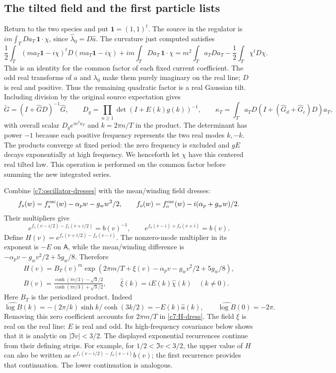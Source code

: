 \subsection{The tilted field and the first particle lists}

Return to the two species and put $\mathbf1=(1,1)^t$.  The source in the
regulator is $im\int_TDa_T\,\mathbf1\cdot\chi$, since
$\widehat\lambda_0=D\widehat a$.  The curvature just computed satisfies
\[
\frac12\int_T(ma_T\mathbf1-i\chi)^tD(ma_T\mathbf1-i\chi)
+im\int_TDa_T\,\mathbf1\cdot\chi
=m^2\int_Ta_TDa_T-\frac12\int_T\chi^tD\chi.
\]
This is an identity for the common factor of each fixed current coefficient.
The odd real transforms of $a$ and $\lambda_0$ make them purely imaginary
on the real line; $D$ is real and positive.  Thus the remaining quadratic
factor is a real Gaussian tilt.  Including division by the original source
expectation gives
\begin{equation}\label{c7:source-removal}
\widetilde G=(I+\widehat GD)^{-1}\widehat G,\qquad
D_g=\prod_{n\ge1}\det(I+E(k)g(k))^{-1},\qquad
\kappa_T=\int_T a_TD(I+(\widehat G_d+\widehat G_c)D)a_T,
\end{equation}
with overall scalar $D_g e^{m^2\kappa_T}$ and $k=2\pi n/T$ in the product.
The determinant has power $-1$ because each positive frequency represents
the two real modes $k,-k$.  The products converge at fixed period: the zero
frequency is excluded and $gE$ decays exponentially at high frequency.
We henceforth let $\chi$ have this centered real tilted law.  This operation
is performed on the common factor before summing the new integrated series.

Combine \eqref{c7:oscillator-dresses} with the mean/winding field dresses:
\[
f_s(w)=f_s^{\rm osc}(w)-\alpha_pw-g_ww^2/2,\qquad
f_o(w)=f_o^{\rm osc}(w)-i(\alpha_p+g_ww)/2.
\]
Their multipliers give
\[
e^{f_s(v-i/2)-f_s(v+i/2)}=b(v)^{-1},\qquad
e^{f_o(v-i)+f_o(v+i)}=b(v).
\]
Define $H(v)=e^{f_s(v+i/2)-f_o(v-i)}$.  The nonzero-mode multiplier in its
exponent is $-E$ on $\mathsf A$, while the mean/winding difference is
$-\alpha_pv-g_wv^2/2+5g_w/8$.  Therefore
\begin{equation}\label{c7:H-dress}
\begin{gathered}
H(v)=B_T(v)^m
 \exp(2\pi m/T+\xi(v)-\alpha_pv-g_wv^2/2+5g_w/8),\\
B(v)=\frac{\cosh(\pi v/3)-\sqrt3/2}
           {\cosh(\pi v/3)+\sqrt3/2},\qquad
\widehat\xi(k)=iE(k)\widehat\chi(k)\quad(k\ne0).
\end{gathered}
\end{equation}
Here $B_T$ is the periodized product.  Indeed
\[
\widehat{\log B}(k)=-(2\pi/k)\sinh k/\cosh(3k/2)
=-E(k)\widehat a(k),\qquad \widehat{\log B}(0)=-2\pi.
\]
Removing this zero coefficient accounts for $2\pi m/T$ in
\eqref{c7:H-dress}.  The field $\xi$ is real on the real line: $E$ is real
and odd.  Its high-frequency covariance below shows that it is analytic on
$|\Im v|<3/2$.  The displayed exponential recurrences continue from their
defining strips.  For example, for $1/2<\Im v<3/2$, the upper value of $H$
can also be written as $e^{f_s(v-i/2)-f_o(v-i)}b(v)$; the first recurrence
provides that continuation.  The lower continuation is analogous.

